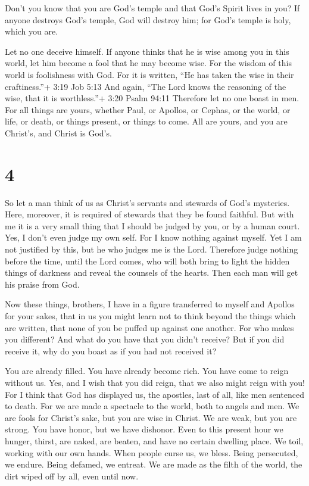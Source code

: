  Don't you know that you are God's temple and that God's
Spirit lives in you?  If anyone destroys God's temple, God
will destroy him; for God's temple is holy, which you are.

 Let no one deceive himself. If anyone thinks that he is
wise among you in this world, let him become a fool that he may become
wise.  For the wisdom of this world is foolishness with
God. For it is written, ``He has taken the wise in their craftiness.''+
3:19 Job 5:13  And again, ``The Lord knows the reasoning of
the wise, that it is worthless.''+ 3:20 Psalm 94:11 
Therefore let no one boast in men. For all things are yours,
 whether Paul, or Apollos, or Cephas, or the world, or
life, or death, or things present, or things to come. All are yours,
 and you are Christ's, and Christ is God's.

\hypertarget{section-3}{%
\section{4}\label{section-3}}

 So let a man think of us as Christ's servants and stewards
of God's mysteries.  Here, moreover, it is required of
stewards that they be found faithful.  But with me it is a
very small thing that I should be judged by you, or by a human court.
Yes, I don't even judge my own self.  For I know nothing
against myself. Yet I am not justified by this, but he who judges me is
the Lord.  Therefore judge nothing before the time, until
the Lord comes, who will both bring to light the hidden things of
darkness and reveal the counsels of the hearts. Then each man will get
his praise from God.

 Now these things, brothers, I have in a figure transferred
to myself and Apollos for your sakes, that in us you might learn not to
think beyond the things which are written, that none of you be puffed up
against one another.  For who makes you different? And what
do you have that you didn't receive? But if you did receive it, why do
you boast as if you had not received it?

 You are already filled. You have already become rich. You
have come to reign without us. Yes, and I wish that you did reign, that
we also might reign with you!  For I think that God has
displayed us, the apostles, last of all, like men sentenced to death.
For we are made a spectacle to the world, both to angels and men.
 We are fools for Christ's sake, but you are wise in
Christ. We are weak, but you are strong. You have honor, but we have
dishonor.  Even to this present hour we hunger, thirst, are
naked, are beaten, and have no certain dwelling place.  We
toil, working with our own hands. When people curse us, we bless. Being
persecuted, we endure.  Being defamed, we entreat. We are
made as the filth of the world, the dirt wiped off by all, even until
now.

